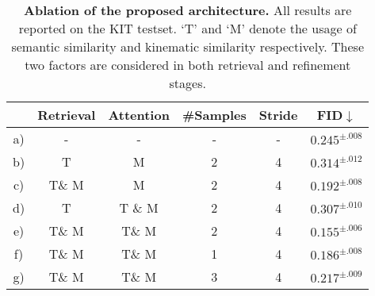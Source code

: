 \documentclass[10pt,twocolumn,letterpaper]{article}
\begin{document}
\begin{table}[t]
\centering
\small
\caption{\textbf{Ablation of the proposed architecture.} All results are reported on the KIT testset. `T' and `M' denote the usage of semantic similarity and kinematic similarity respectively. These two factors are considered in both retrieval and refinement stages.}
\label{tab:cross_attention}
\setlength{\tabcolsep}{1.4mm}
{
\begin{tabular}{cccccc}
\hline

& Retrieval & Attention & \#Samples & Stride & FID$\downarrow$ \\
\hline
a) & - & - & - & - & $0.245^{\pm.008}$ \\
\hline
b) & T & M & 2 & 4 & $0.314^{\pm.012}$ \\
c) & T\& M & M & 2 & 4 & $0.192^{\pm.008}$ \\
d) & T & T \& M & 2 & 4 & $0.307^{\pm.010}$ \\
e) & T\& M & T\& M & 2 & 4 & $0.155^{\pm.006}$ \\
\hline
f) & T\& M & T\& M & 1 & 4 & $0.186^{\pm.008}$ \\
g) & T\& M & T\& M & 3 & 4 & $0.217^{\pm.009}$ \\
\hline
\end{tabular}}
\vspace{-10pt}
\end{table}
\end{document}
